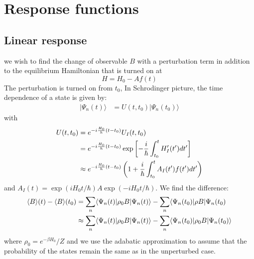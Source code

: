 \documentclass{article}
\begin{document}
\section{Response functions}
\subsection{Linear response}
we wish to find the change of observable $B$ with a perturbation term in addition to the equilibrium Hamiltonian 
that is turned on at 
\begin{equation}
     H = H_0 - Af(t)
\end{equation}
The perturbation is turned on from $t_0$, 
In Schrodinger picture, the time dependence of a state is given by:
\begin{align}
    | \Psi_n(t) \rangle &= U(t,t_0) | \Psi_n(t_0) \rangle 
\end{align}
with
\begin{align}
    U(t,t_0) &= e^{-i\frac{H_0}{h}(t-t_0)} U_I(t,t_0) \notag \\
                 &= e^{-i\frac{H_0}{h}(t-t_0)} \exp\left[ -\frac{i}{\hbar} \int_{t_0}^{t} H_I'(t') dt'  \right] \notag \\
                 &\approx e^{-i\frac{H_0}{h}(t-t_0)} \left( 1 + \frac{i}{\hbar} \int_{t_0}^{t} A_I(t')f(t') dt' \right)
\end{align}
and $A_I(t) = \exp(iH_0t/\hbar) A \exp(-iH_0t/\hbar)$. We find the difference:
\begin{align}
    \langle B \rangle(t) - \langle B \rangle(t_0) 
    &= \sum_n \langle \Psi_n(t) | \rho_{0} B | \Psi_n(t) \rangle - \sum_n \langle \Psi_n(t_0) | \rho B | \Psi_n(t_0) \notag \\
    &\approx \sum_n \langle \Psi_n(t) | \rho_{0} B | \Psi_n(t) \rangle - \sum_n \langle \Psi_n(t_0) | \rho_{0} B | \Psi_n(t_0) \rangle
\end{align}
where $\rho_0 = e^{-\beta H_0} / Z$ and we use the adabatic approximation to assume that the probability of 
the states remain the same as in the unperturbed case. 
\end{document}
